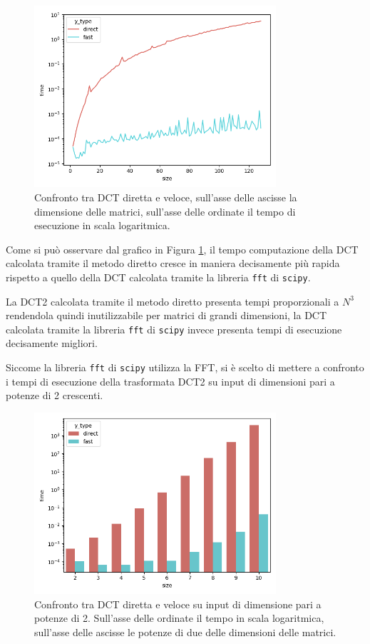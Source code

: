 \documentclass[a4paper, 12pt]{article}
\begin{document}
\begin{figure}[H]
	\includegraphics[width=0.8\textwidth]{imgs/bench-incremental-0.png}
	\caption{Confronto tra DCT diretta e veloce, sull'asse delle ascisse la
		dimensione delle matrici, sull'asse delle ordinate il tempo di esecuzione in
		scala logaritmica.}
	\label{fig:incremental-benchmark}
\end{figure}

Come si può osservare dal grafico in Figura
\ref{fig:incremental-benchmark}, il tempo computazione della DCT calcolata
tramite il metodo diretto cresce in maniera decisamente più rapida rispetto a
quello della DCT calcolata tramite la libreria \texttt{fft} di \texttt{scipy}.

La DCT2 calcolata tramite il metodo diretto presenta tempi proporzionali a $N^3$
rendendola quindi inutilizzabile per matrici di grandi dimensioni, la DCT calcolata
tramite la libreria \texttt{fft} di \texttt{scipy} invece presenta tempi di esecuzione 
decisamente migliori.

Siccome la libreria \texttt{fft} di \texttt{scipy} utilizza la FFT, si è scelto
di mettere a confronto i tempi di esecuzione della trasformata DCT2 su input di
dimensioni pari a potenze di 2 crescenti.

\begin{figure}[H]
	\centering
	\includegraphics[width=0.8\textwidth]{imgs/bench-order-0.png}
	\caption{Confronto tra DCT diretta e veloce su input di dimensione pari a
		potenze di 2. Sull'asse delle ordinate il tempo in scala logaritmica,
		sull'asse delle ascisse le potenze di due delle dimensioni delle matrici.}
	\label{fig:order-benchmark}
\end{figure}
\end{document}
